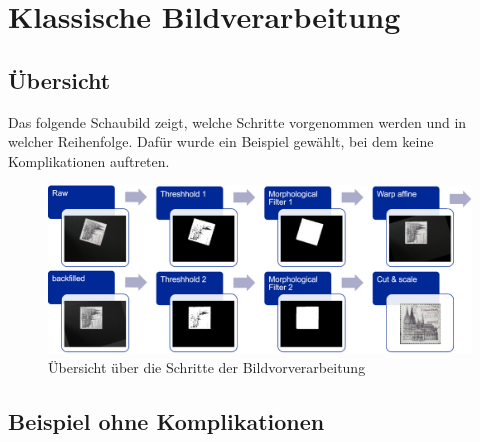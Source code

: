 \documentclass[12pt,toc=bib,toc=listof]{scrreprt}
\begin{document}

\chapter{Klassische Bildverarbeitung} %
\label{sec:klass_bv}

\section{Übersicht}
\label{sec_bv:übersicht}
Das folgende Schaubild zeigt, welche Schritte vorgenommen werden und in welcher Reihenfolge. Dafür wurde ein Beispiel gewählt, bei dem keine Komplikationen auftreten.
\begin{figure}[h]
\includegraphics[width=\textwidth]{./bilder/bv_overview.png}
\caption{Übersicht über die Schritte der Bildvorverarbeitung}
\label{fig:bv_overview}
\end{figure}

\section{Beispiel ohne Komplikationen}
\label{sec_bv:paradebsp}
\end{document}
